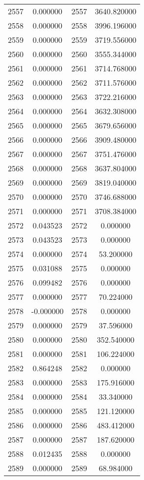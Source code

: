 \documentclass[12pt]{article}
\begin{document}
\begin{longtable}{@{}cccc@{}}
2557 & 0.000000 & 2557 & 3640.820000 \\
2558 & 0.000000 & 2558 & 3996.196000 \\
2559 & 0.000000 & 2559 & 3719.556000 \\
2560 & 0.000000 & 2560 & 3555.344000 \\
2561 & 0.000000 & 2561 & 3714.768000 \\
2562 & 0.000000 & 2562 & 3711.576000 \\
2563 & 0.000000 & 2563 & 3722.216000 \\
2564 & 0.000000 & 2564 & 3632.308000 \\
2565 & 0.000000 & 2565 & 3679.656000 \\
2566 & 0.000000 & 2566 & 3909.480000 \\
2567 & 0.000000 & 2567 & 3751.476000 \\
2568 & 0.000000 & 2568 & 3637.804000 \\
2569 & 0.000000 & 2569 & 3819.040000 \\
2570 & 0.000000 & 2570 & 3746.688000 \\
2571 & 0.000000 & 2571 & 3708.384000 \\
2572 & 0.043523 & 2572 & 0.000000 \\
2573 & 0.043523 & 2573 & 0.000000 \\
2574 & 0.000000 & 2574 & 53.200000 \\
2575 & 0.031088 & 2575 & 0.000000 \\
2576 & 0.099482 & 2576 & 0.000000 \\
2577 & 0.000000 & 2577 & 70.224000 \\
2578 & -0.000000 & 2578 & 0.000000 \\
2579 & 0.000000 & 2579 & 37.596000 \\
2580 & 0.000000 & 2580 & 352.540000 \\
2581 & 0.000000 & 2581 & 106.224000 \\
2582 & 0.864248 & 2582 & 0.000000 \\
2583 & 0.000000 & 2583 & 175.916000 \\
2584 & 0.000000 & 2584 & 33.340000 \\
2585 & 0.000000 & 2585 & 121.120000 \\
2586 & 0.000000 & 2586 & 483.412000 \\
2587 & 0.000000 & 2587 & 187.620000 \\
2588 & 0.012435 & 2588 & 0.000000 \\
2589 & 0.000000 & 2589 & 68.984000 \\

\end{longtable}
\end{document}
